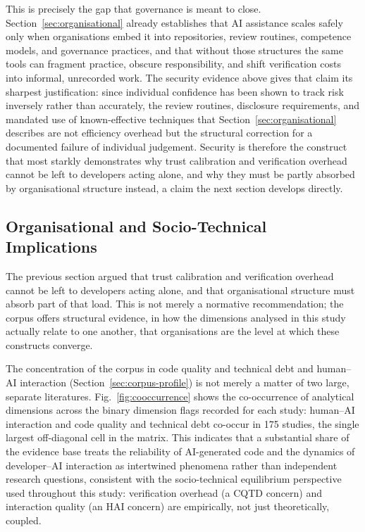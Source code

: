 This is precisely the gap that governance is meant to close. Section~\ref{sec:organisational} already establishes that AI assistance scales safely only when organisations embed it into repositories, review routines, competence models, and governance practices, and that without those structures the same tools can fragment practice, obscure responsibility, and shift verification costs into informal, unrecorded work. The security evidence above gives that claim its sharpest justification: since individual confidence has been shown to track risk inversely rather than accurately, the review routines, disclosure requirements, and mandated use of known-effective techniques that Section~\ref{sec:organisational} describes are not efficiency overhead but the structural correction for a documented failure of individual judgement. Security is therefore the construct that most starkly demonstrates why trust calibration and verification overhead cannot be left to developers acting alone, and why they must be partly absorbed by organisational structure instead, a claim the next section develops directly.

\subsection{Organisational and Socio-Technical Implications}
\label{sec:disc-organisational} 
The previous section argued that trust calibration and verification overhead cannot be left to developers acting alone, and that organisational structure must absorb part of that load. This is not merely a normative recommendation; the corpus offers structural evidence, in how the dimensions analysed in this study actually relate to one another, that organisations are the level at which these constructs converge.

The concentration of the corpus in code quality and technical debt and human--AI interaction (Section~\ref{sec:corpus-profile}) is not merely a matter of two large, separate literatures. Fig.~\ref{fig:cooccurrence} shows the co-occurrence of analytical dimensions across the binary dimension flags recorded for each study: human--AI interaction and code quality and technical debt co-occur in 175 studies, the single largest off-diagonal cell in the matrix. This indicates that a substantial share of the evidence base treats the reliability of AI-generated code and the dynamics of developer--AI interaction as intertwined phenomena rather than independent research questions, consistent with the socio-technical equilibrium perspective used throughout this study: verification overhead (a CQTD concern) and interaction quality (an HAI concern) are empirically, not just theoretically, coupled.

